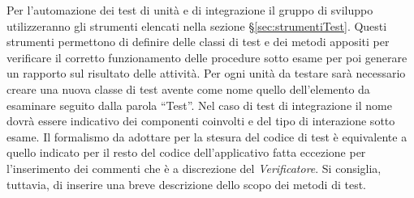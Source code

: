   Per l’automazione dei test di unità e di integrazione il gruppo di sviluppo utilizzeranno gli strumenti elencati nella sezione \S\ref{sec:strumentiTest}. Questi strumenti permettono di definire delle classi di test
  e dei metodi appositi per verificare il corretto funzionamento delle procedure sotto esame per poi generare un rapporto sul risultato delle attività.
  Per ogni unità da testare sarà necessario creare una nuova classe di test avente come nome quello dell’elemento da esaminare seguito dalla parola “Test”. Nel caso di test di integrazione il nome dovrà essere indicativo dei componenti coinvolti e del tipo di interazione sotto esame. Il formalismo da adottare per la stesura del codice di test è equivalente a quello indicato per il resto del codice dell’applicativo fatta eccezione per l’inserimento dei commenti che è a discrezione del \emph{Verificatore}. Si consiglia, tuttavia, di inserire una breve descrizione dello scopo dei metodi di test.
  

